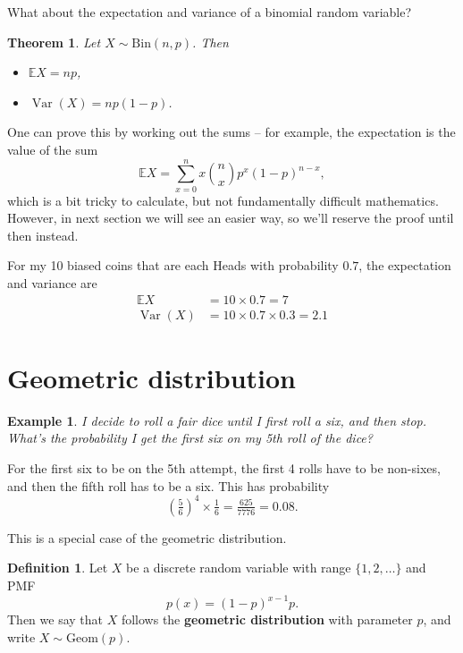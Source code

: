 \documentclass[
  a4paper,
]{book}
\providecommand{\tightlist}{%
  \setlength{\itemsep}{0pt}\setlength{\parskip}{0pt}}
\newtheorem{theorem}{Theorem}[chapter]
\theoremstyle{definition}
\newtheorem{definition}{Definition}[chapter]
\theoremstyle{definition}
\newtheorem{example}{Example}[chapter]
\theoremstyle{definition}
\theoremstyle{definition}
\theoremstyle{remark}
\begin{document}
What about the expectation and variance of a binomial random variable?

\begin{theorem}

Let \(X \sim \text{Bin}(n, p)\). Then

\begin{itemize}
\tightlist
\item
  \(\mathbb EX = np\),
\item
  \(\operatorname{Var}(X) =np(1-p)\).
\end{itemize}

\end{theorem}

One can prove this by working out the sums -- for example, the expectation is the value of the sum
\[ \mathbb EX = \sum_{x=0}^n x \binom{n}{x} p^x (1-p)^{n-x} , \]
which is a bit tricky to calculate, but not fundamentally difficult mathematics.
However, in next section we will see an easier way, so we'll reserve the proof until then instead.

For my 10 biased coins that are each Heads with probability \(0.7\), the expectation and variance are
\begin{align*}
  \mathbb EX &= 10 \times 0.7 = 7 \\
  \operatorname{Var}(X) &= 10 \times 0.7 \times 0.3 = 2.1
\end{align*}

\hypertarget{geometric}{%
\section{Geometric distribution}\label{geometric}}

\begin{example}
\emph{I decide to roll a fair dice until I first roll a six, and then stop. What's the probability I get the first six on my 5th roll of the dice?}

For the first six to be on the 5th attempt, the first 4 rolls have to be non-sixes, and then the fifth roll has to be a six. This has probability
\[ \left(\tfrac56\right)^4 \times  \tfrac16 = \tfrac{625}{7776} = 0.08.\]
\end{example}

This is a special case of the geometric distribution.

\begin{definition}
Let \(X\) be a discrete random variable with range \(\{1,2,\dots\}\) and PMF
\[ p(x) = (1-p)^{x-1}p . \]
Then we say that \(X\) follows the \textbf{geometric distribution} with parameter \(p\), and write \(X \sim \text{Geom}(p)\).
\end{definition}
\end{document}
